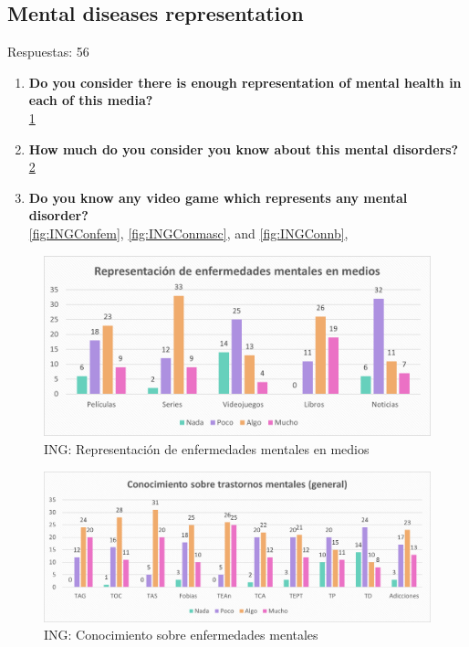 \documentclass[12pt, a4paper,twoside,titlepage]{book}
\begin{document}
\subsection{Mental diseases representation}
Respuestas: 56
\begin{enumerate}[label=\textbf{\arabic*}.]
     \item \textbf{Do you consider there is enough representation of mental health in each of this media?}\\
     \ref{fig:INGMedios}
     \item \textbf{How much do you consider you know about this mental disorders?}\\
     \ref{fig:INGCon}
     \item \textbf{Do you know any video game which represents any mental disorder?}\\
       \ref{fig:INGConfem}, \ref{fig:INGConmasc}, and
       \ref{fig:INGConnb},
\end{enumerate}




\begin{figure}
    \centering
    \includegraphics[width=1\linewidth]{ANEXO ING/7AnexINGMedios}
    \caption{ING: Representación de enfermedades mentales en medios}
    \label{fig:INGMedios}
\end{figure}


\begin{figure}
    \centering
    \includegraphics[width=1\linewidth]{ANEXO ING/8AnexINGCon}
    \caption{ING: Conocimiento sobre enfermedades mentales}
    \label{fig:INGCon}
\end{figure}
\end{document}
